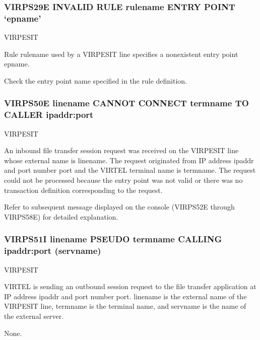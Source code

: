 \documentclass[letterpaper,10pt,english]{sphinxmanual}
\begin{document}
\subsubsection{VIRPS29E INVALID RULE rulename ENTRY POINT ‘epname’}
\label{\detokenize{messages:virps29e-invalid-rule-rulename-entry-point-epname}}\begin{description}
\sphinxAtStartPar
VIRPESIT

\sphinxAtStartPar
Rule rulename used by a VIRPESIT line specifies a non\sphinxhyphen{}existent entry point epname.

\sphinxAtStartPar
Check the entry point name specified in the rule definition.

\end{description}


\subsubsection{VIRPS50E linename CANNOT CONNECT termname TO CALLER ipaddr:port}
\label{\detokenize{messages:virps50e-linename-cannot-connect-termname-to-caller-ipaddr-port}}\begin{description}
\sphinxAtStartPar
VIRPESIT

\sphinxAtStartPar
An inbound file transfer session request was received on the VIRPESIT line whose external name is linename. The request originated from IP address ipaddr  and port number port and the VIRTEL terminal  name is termname.     The request could not be processed because the entry point was not valid or there was no transaction definition corresponding to the request.

\sphinxAtStartPar
Refer to subsequent message displayed on the console (VIRPS52E through VIRPS58E) for detailed explanation.

\end{description}


\subsubsection{VIRPS51I linename PSEUDO termname CALLING ipaddr:port (servname)}
\label{\detokenize{messages:virps51i-linename-pseudo-termname-calling-ipaddr-port-servname}}\begin{description}
\sphinxAtStartPar
VIRPESIT

\sphinxAtStartPar
VIRTEL is sending an outbound session request to the file transfer application at IP address ipaddr and port number port. linename is the external name of the VIRPESIT line, termname is the terminal name, and servname is the name of the external server.

\sphinxAtStartPar
None.

\end{description}
\end{document}
